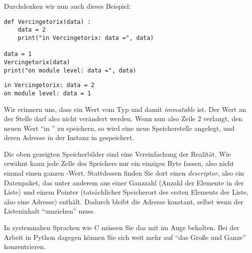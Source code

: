 \begin{tcolorbox}[title=Speicherbild]
\begin{center}
\end{center}
\end{tcolorbox}


Durchdenken wir nun auch dieses Beispiel:
\begin{codebox}
\begin{verbatim}
def Vercingetorix(data) :
    data = 2
    print("in Vercingetorix: data =", data)

data = 1
Vercingetorix(data)
print("on module level: data =", data)
\end{verbatim}
\end{codebox}

\begin{cmdbox}
\begin{verbatim}
in Vercingetorix: data = 2
on module level: data = 1
\end{verbatim}
\end{cmdbox}

Wir erinnern uns, dass  ein Wert vom Typ  und damit \emph{immutable} ist. Der Wert an der Stelle  darf also nicht verändert werden. Wenn nun also Zeile 2 verlangt, den neuen Wert  \enquote{in } zu speichern, so wird eine neue Speicherstelle angelegt, und deren Adresse in der Instanz  in  gespeichert.

\begin{hintbox}
Die oben gezeigten Speicherbilder sind eine Vereinfachung der Realität. Wie erwähnt kann jede Zelle des Speichers nur ein einziges Byte fassen, also nicht einmal einen ganzen -Wert. Stattdessen finden Sie dort einen \emph{descriptor}, also ein Datenpaket, das unter anderem aus einer Ganzzahl (Anzahl der Elemente in der Liste) und einem Pointer (tatsächlicher Speicherort des ersten Elements der Liste, also eine Adresse) enthält. Dadurch bleibt die Adresse  konstant, selbst wenn der Listeninhalt \enquote{umziehen} muss.

In systemnahen Sprachen wie C müssen Sie das mit im Auge behalten. Bei der Arbeit in Python dagegen können Sie sich weit mehr auf \enquote{das Große und Ganze} konzentrieren.
\end{hintbox}

